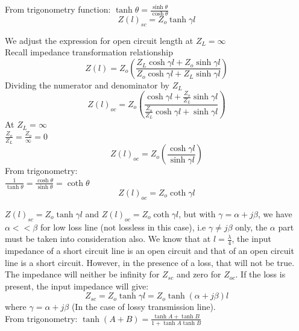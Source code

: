 From trigonometry function:
$ \tanh\theta =\frac{\sinh\theta}{\cosh\theta} $
\begin{equation}
\boxed{Z(l)_{sc}=Z_{o}\tanh\gamma l}	\end{equation}

We adjust the expression for open circuit length at $ Z_{L} =\infty $ \\
Recall impedance transformation relationship
\begin{equation}
Z(l) = Z_{o}\left(\frac{Z_{L}\cosh\gamma l + Z_{o}\sinh\gamma l}{Z_{o}\cosh\gamma l + Z_{L}\sinh\gamma l}\right)
\end{equation}
Dividing the numerator and denominator by $ Z_{L} $
\begin{equation}
Z(l)_{oc} = Z_{o}\left(\frac{\cosh\gamma l +\frac{Z_{o}}{Z_{L}}\sinh\gamma l}{\frac{Z_{o}}{Z_{L}}\cosh\gamma l+ \sinh\gamma l}\right)
\end{equation}
At $ Z_{L}=\infty $ \\
$ \frac{Z_{o}}{Z_{L}} =\frac{Z_{o}}{\infty} = 0 $ 
\begin{equation}
Z(l)_{oc} = Z_{o}\left(\frac{\cosh\gamma l}{\sinh\gamma l}\right)
\end{equation} 
From trigonometry:\\
$ \frac{1}{\tanh\theta}=\frac{\cosh\theta}{\sinh\theta}=\coth\theta $
\begin{equation}
\boxed{Z(l)_{oc}=Z_{o}\coth\gamma l}	
\end{equation}

$ Z(l)_{sc}=Z_{o}\tanh\gamma l $ and $ Z(l)_{oc}=Z_{o}\coth\gamma l $, but with $ \gamma=\alpha +j\beta $, we have $ \alpha<<\beta $ for low loss line (not lossless in this case), i.e $ \gamma\neq j\beta $ only, the $ \alpha $ part must be taken into consideration also. We know that at $ l=\frac{\lambda}{4} $, the input impedance of a short circuit line is an open circuit and that of an open circuit line is a short circuit. However, in the presence of a loss, that will not be true. The impedance will neither be infinity for $ Z_{sc} $ and zero for $ Z_{oc} $. If the loss is present, the input impedance will give:\\
\begin{equation}
Z_{sc}=Z_{o}\tanh\gamma l=Z_{o}\tanh(\alpha+j\beta)l
\end{equation}
where $ \gamma=\alpha+j\beta $ (In the case of lossy transmission line).\\

From trigonometry:
$\tanh(A+B)=\frac{\tanh A+\tanh B}{1+\tanh A\tanh B} $

